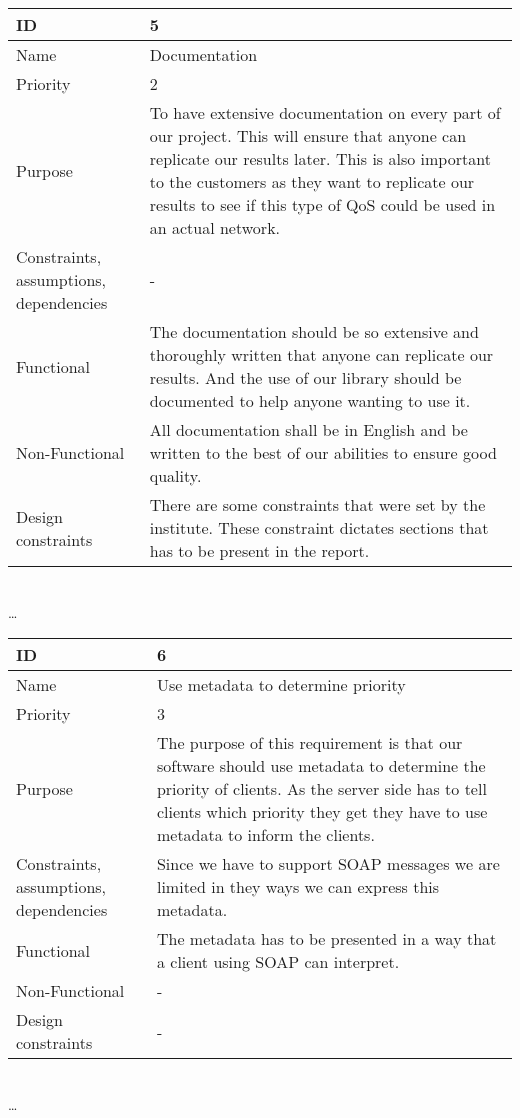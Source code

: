 \begin{center}
	\begin{tabular}{| p{4cm} | p{8cm} |}
		\hline
		ID & 5 \\
		\hline
		Name & Documentation  \\
		\hline
		Priority & 2 \\
		\hline
		Purpose & To have extensive documentation on every part of our project. This will ensure that anyone can replicate our results later. This is also important to the customers as they want to replicate our results to see if this type of QoS could be used in an actual network.\\
		\hline 
		Constraints, assumptions, dependencies & -\\
		\hline  
		Functional & The documentation should be so extensive and thoroughly written that anyone can replicate our results. And the use of our library should be documented to help anyone wanting to use it. \\
		\hline
		Non-Functional & All documentation shall be in English and be written to the best of our abilities to ensure good quality. \\ 
		\hline
		Design constraints & There are some constraints that were set by the institute. These constraint dictates sections that has to be present in the report. \\
		\hline
	\end{tabular}
	\\  \ldots  \\

	\begin{tabular}{| p{4cm} | p{8cm} |}
		\hline
		ID & 6 \\
		\hline
		Name & Use metadata to determine priority  \\
		\hline
		Priority & 3 \\
		\hline
		Purpose & The purpose of this requirement is that our software should use metadata to determine the priority of clients. As the server side has to tell clients which priority they get they have to use metadata to inform the clients. \\
		\hline 
		Constraints, assumptions, dependencies & Since we have to support SOAP messages we are limited in they ways we can express this metadata. \\
		\hline  
		Functional & The metadata has to be presented in a way that a client using SOAP can interpret. \\
		\hline
		Non-Functional & -\\ 
		\hline
		Design constraints & -\\
		\hline
	\end{tabular}
	\\  \ldots  \\


\end{center}
